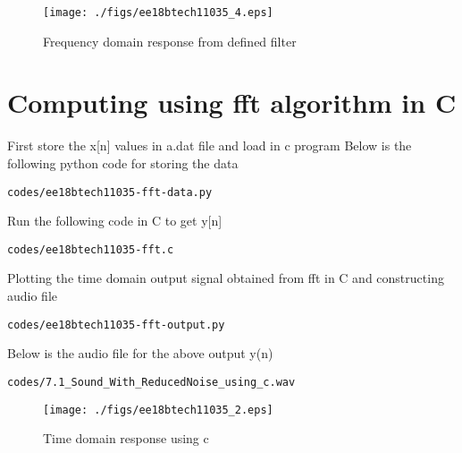 \documentclass[journal,12pt,twocolumn]{IEEEtran}
\begin{document}
\begin{figure}[!h]
\centering
\texttt{[image: ./figs/ee18btech11035\_4.eps]}
\caption{Frequency domain response from defined filter}
\label{fig:Figure4}
\end{figure}


\section{Computing using fft algorithm in C}
First store the x[n] values in a.dat file and load in c program
Below is the following python code for storing the data
\begin{lstlisting}
codes/ee18btech11035-fft-data.py
\end{lstlisting}
Run the following code in C to get y[n]
\begin{lstlisting}
codes/ee18btech11035-fft.c
\end{lstlisting}
Plotting the time domain output signal obtained from fft in C and constructing audio file
\begin{lstlisting}
codes/ee18btech11035-fft-output.py
\end{lstlisting}
Below is the audio file for the above output y(n)
\begin{lstlisting}
codes/7.1_Sound_With_ReducedNoise_using_c.wav
\end{lstlisting}
\begin{figure}[!h]
\centering
\texttt{[image: ./figs/ee18btech11035\_2.eps]}
\caption{Time domain response using c}
\label{fig:Figure2}
\end{figure}
\end{document}
